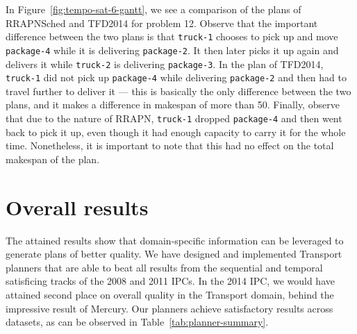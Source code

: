 {In Figure~\ref{fig:tempo-sat-6-gantt}, we see a comparison of the plans
of RRAPNSched and TFD2014 for problem 12.
Observe that the important difference between the two plans
is that \texttt{truck-1} chooses to pick up and move \texttt{package-4}
while it is delivering \texttt{package-2}. It then later picks it up again and delivers
it while \texttt{truck-2} is delivering \texttt{package-3}.
In the plan of TFD2014, \texttt{truck-1} did not pick up \texttt{package-4}
while delivering \texttt{package-2} and then had to travel further to deliver it
--- this is basically the only difference between the two plans,
and it makes a difference in makespan of more than 50.
Finally, observe that due to the nature of RRAPN, \texttt{truck-1}
dropped \texttt{package-4} and then went back to pick it up, even though it had enough capacity
to carry it for the whole time. 
Nonetheless, it is important to note that this had no effect on the total makespan
of the plan.

\section{Overall results}

The attained results show that domain-specific information can be leveraged
to generate plans of better quality.
We have designed and implemented Transport planners that are able to beat
all results from the sequential
and temporal satisficing tracks of the 2008 and 2011 IPCs.
In the 2014 IPC, we would have attained second place on overall quality in the Transport domain, behind the impressive result of Mercury. 
Our planners achieve satisfactory results across datasets,
as can be observed in Table~\ref{tab:planner-summary}.

}
